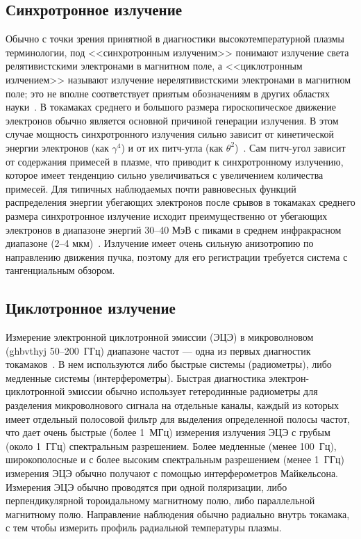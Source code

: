 
\subsection{Синхротронное излучение}

Обычно с точки зрения принятной в диагностики высокотемпературной плазмы терминологии, под <<синхротронным излученим>> понимают излучение света релятивистскими электронами в магнитном поле, а <<циклотронным излчением>> называют излучение нерелятивистскими электронами в магнитном поле; это не вполне соответствует приятым обозначениям в других областях науки~\cite{Breizman2019}. В токамаках среднего и большого размера гироскопическое движение электронов обычно является основной причиной генерации излучения. В этом случае мощность синхротронного излучения сильно зависит от кинетической энергии электронов (как $\gamma^4$) и от их питч-угла (как $\theta^2$)~\cite{Pankratov1999}. Сам питч-угол зависит от содержания примесей в плазме, что приводит к синхротронному излучению, которое имеет тенденцию сильно увеличиваться с увеличением количества примесей. Для типичных наблюдаемых почти равновесных функций распределения энергии убегающих электронов после срывов в токамаках среднего размера синхротронное излучение исходит преимущественно от убегающих электронов в диапазоне энергий 30--40 МэВ с пиками в среднем инфракрасном диапазоне (2--4 мкм)~\cite{Stahl2013}. Излучение имеет очень сильную анизотропию по направлению движения пучка, поэтому для его регистрации требуется система с тангенциальным обзором.~\cite{Breizman2019} 


\subsection{Циклотронное излучение}

Измерение электронной циклотронной эмиссии (ЭЦЭ) в микроволновом (ghbvthyj 50--200~ГГц) диапазоне частот --- одна из первых диагностик токамаков~\cite{Costley1974}. В нем используются либо быстрые системы (радиометры), либо медленные системы (интерферометры). Быстрая диагностика электрон-циклотронной эмиссии обычно использует гетеродинные радиометры для разделения микроволнового сигнала на отдельные каналы, каждый из которых имеет отдельный полосовой фильтр для выделения определенной полосы частот, что дает очень быстрые (более 1~МГц) измерения излучения ЭЦЭ с грубым (около 1~ГГц) спектральным разрешением. Более медленные (менее 100~Гц), широкополосные и с более высоким спектральным разрешением (менее 1~ГГц) измерения ЭЦЭ обычно получают с помощью интерферометров Майкельсона. Измерения ЭЦЭ обычно проводятся при одной поляризации, либо перпендикулярной тороидальному магнитному полю, либо параллельной магнитному полю. Направление наблюдения обычно радиально внутрь токамака, с тем чтобы измерить профиль радиальной температуры плазмы.~\cite{Breizman2019}

